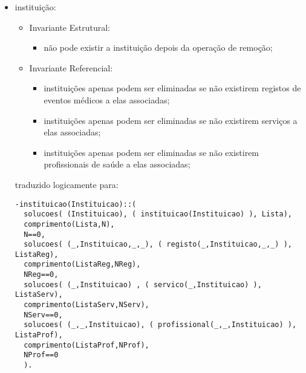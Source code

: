 \documentclass[
  oneside,
  10pt, a4paper,
  footinclude=true,
  headinclude=true,
  cleardoublepage=empty
]{scrbook}
\begin{document}
\begin{itemize}
\item   instituição:
\begin{itemize}
\item        Invariante Estrutural:
\begin{itemize}
\item         não pode existir a instituição depois da operação de remoção;
\end{itemize}
\item        Invariante Referencial:
\begin{itemize}
\item         instituições apenas podem ser eliminadas se não existirem registos de eventos médicos a elas associadas;
\item         instituições apenas podem ser eliminadas se não existirem serviços a elas associadas;
\item         instituições apenas podem ser eliminadas se não existirem profissionais de saúde a elas associadas;
\end{itemize}
\end{itemize}
traduzido logicamente para:
\begin{lstlisting}
-instituicao(Instituicao)::(
  solucoes( (Instituicao), ( instituicao(Instituicao) ), Lista),
  comprimento(Lista,N),
  N==0,
  solucoes( (_,Instituicao,_,_), ( registo(_,Instituicao,_,_) ), ListaReg),
  comprimento(ListaReg,NReg),
  NReg==0,
  solucoes( (_,Instituicao) , ( servico(_,Instituicao) ), ListaServ),
  comprimento(ListaServ,NServ),
  NServ==0,
  solucoes( (_,_,Instituicao), ( profissional(_,_,Instituicao) ), ListaProf),
  comprimento(ListaProf,NProf),
  NProf==0
  ).
\end{lstlisting}




\end{itemize}
\end{document}
